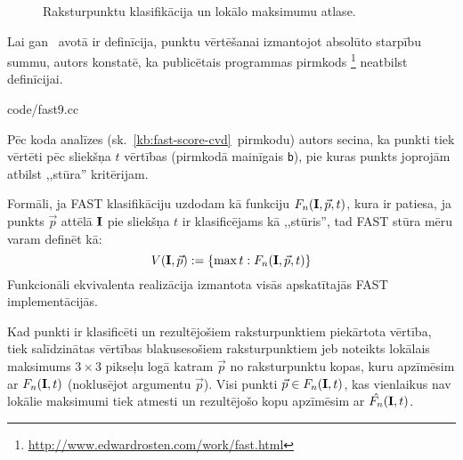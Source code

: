 \begin{figure}[tbh]
	\centering
	\def\svgwidth{0.8\linewidth}
	{}
	\caption{Raksturpunktu klasifikācija un lokālo maksimumu atlase.}
	\label{fig:nonmax}
\end{figure}

Lai gan \cite{FAST}~avotā ir definīcija, punktu vērtēšanai izmantojot
absolūto starpību summu, autors konstatē, ka publicētais programmas pirmkods%
\footnote{\url{http://www.edwardrosten.com/work/fast.html}}
neatbilst definīcijai.

	
		{code/fast9.cc}

Pēc koda analīzes (sk.~\ref{kb:fast-score-cvd}~pirmkodu)
autors secina, ka punkti tiek vērtēti pēc sliekšņa $t$ vērtības
(pirmkodā mainīgais \texttt{b}), pie kuras
punkts joprojām atbilst ,,stūra'' kritērijam.

Formāli, ja FAST klasifikāciju uzdodam kā funkciju $F_n(\mathbf{I}, \vec{p}, t)$,
kura ir patiesa, ja punkts $\vec{p}$ attēlā $\mathbf{I}$
pie sliekšņa $t$ ir klasificējams
kā ,,stūris'', tad FAST stūra mēru varam definēt kā:
\begin{equation}\label{eq:fast-response}
	V(\mathbf{I}, \vec{p}) := \left\{ \max{t} : F_n(\mathbf{I}, \vec{p}, t) \right\}
\end{equation}
Funkcionāli ekvivalenta realizācija izmantota visās apskatītajās FAST
implementācijās.


Kad punkti ir klasificēti un rezultējošiem raksturpunktiem piekārtota
vērtība, tiek salīdzinātas vērtības blakusesošiem raksturpunktiem
jeb noteikts lokālais maksimums $3 \times 3$ pikseļu logā katram
$\vec{p}$ no raksturpunktu kopas, kuru apzīmēsim ar $F_n(\mathbf{I}, t)$
(noklusējot argumentu $\vec{p}$).
Visi punkti $\vec{p} \in F_n(\mathbf{I}, t)$, kas vienlaikus nav lokālie
maksimumi tiek atmesti un rezultējošo kopu apzīmēsim ar
$\hat{F_n}(\mathbf{I}, t)$.

